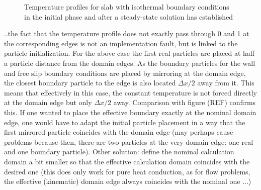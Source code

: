 \documentclass{report}
\begin{document}
\begin{figure}[!htbp]
\centering
\label{fig:PureHeat_Isothermal}

\caption[Temperature profiles for slab with isothermal edges]{Temperature profiles for slab with isothermal boundary conditions  in the initial phase and  after a steady-state solution has established}

\end{figure}

..the fact that the temperature profile does not exactly pass through 0 and 1 at the corresponding edges is not an implementation fault, but is linked to the particle initialization. For the above case the first real particles are placed at half a particle distance from the domain edges. As the boundary particles for the wall and free slip boundary conditions are placed by mirroring at the domain edge, the closest boundary particle to the edge is also located $\Delta x/2$ away from it. This means that effectively in this case, the constant temperature is not forced directly at the domain edge but only $\Delta x/2$ away. Comparison with figure (REF) confirms this. If one wanted to place the effective boundary exactly at the nominal domain edge, one would have to adapt the initial particle placement in a way that the first mirrored particle coincides with the domain edge (may perhaps cause problems because then, there are two particles at the very domain edge: one real and one boundary particle). Other solution: define the nominal calculation domain a bit smaller so that the effective calculation domain coincides with the desired one (this does only work for pure heat conduction, as for flow problems, the effective (kinematic) domain edge always coincides with the nominal one ...)
\end{document}
